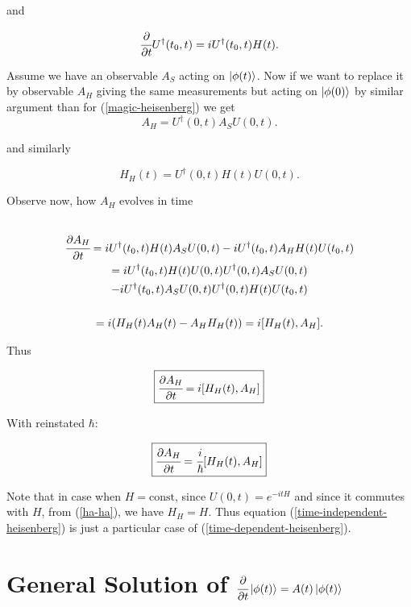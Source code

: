 \documentclass[main.tex]{subfiles}
\begin{document}
and

\begin{equation}
\cfrac{\partial}{\partial t} U^\dag(t_0, t) = i U^\dag(t_0, t) H(t).
\end{equation}


Assume we have an observable $A_S$ acting on $\ket{\phi(t)}$. Now if we want to replace it by observable $A_H$ giving the same measurements but acting on $\ket{\phi(0)}$ by similar argument than for (\ref{magic-heisenberg}) we get
\begin{equation}
A_H = U^\dag(0, t) A_S U(0, t).
\end{equation}

and similarly

\begin{equation}
\label{ha-ha}
H_H(t) = U^\dag(0, t) H(t) U(0, t).
\end{equation}


Observe now, how $A_H$ evolves in time
\begin{multline*}\\
\cfrac{\partial A_H}{\partial t} = i U^\dag(t_0, t) H(t) A_S U(0, t) - i  U^\dag(t_0, t) A_H H(t) U(t_0, t)\\
= i U^\dag(t_0, t) H(t) U(0, t) U^\dag(0, t) A_S U(0, t) 
\\- i  U^\dag(t_0, t) A_S  U(0, t) U^\dag(0, t) H(t) U(t_0, t)\\
\\ = i (H_H(t)A_H(t)  - A_H H_H(t)) = i [H_H(t), A_H].
\\
\end{multline*}

Thus

\begin{equation}
\label{time-dependent-heisenberg}
\boxed{
\cfrac{\partial A_H}{\partial t} = i [H_H(t), A_H]
}
\end{equation}

With reinstated $\hbar$:

\begin{equation}
\boxed{
\cfrac{\partial A_H}{\partial t} = \cfrac{i}{\hbar} [H_H(t), A_H]
}
\end{equation}

Note that in case when $H = \text{const}$, since $U(0, t) = e^{-itH}$ and since it commutes with $H$, from (\ref{ha-ha}), we have $H_H = H$. Thus equation (\ref{time-independent-heisenberg}) is just a particular case of (\ref{time-dependent-heisenberg}).
\section{General Solution of $\cfrac{\partial}{\partial t}\ket{\phi(t)} = A(t) \ket{\phi(t)}$}
\end{document}
